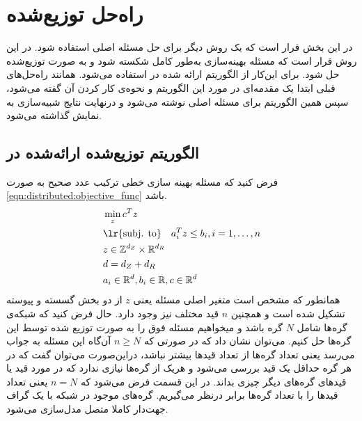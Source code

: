 



\section{راه‌حل توزیع‌شده}

در این بخش قرار است که یک روش دیگر برای حل مسئله اصلی استفاده شود. در این روش قرار است که مسئله بهینه‌سازی به‌طور کامل شکسته شود و به صورت توزیع‌شده حل شود. برای این‌کار از الگوریتم ارائه شده در \cite{testa2019distributed} استفاده می‌شود. همانند راه‌حل‌های قبلی ابتدا یک مقدمه‌ای  در مورد این الگوریتم و نحوه‌ی کار کردن آن گفته می‌شود، سپس همین الگوریتم برای مسئله اصلی نوشته می‌شود و درنهایت نتایج شبیه‌سازی به نمایش گذاشته می‌شود. 
\subsection{الگوریتم توزیع‌شده ارائه‌شده در \cite{testa2019distributed}}
فرض کنید که مسئله بهینه سازی خطی ترکیب عدد صحیح به صورت \cref{eqn:distributed:objective_func} باشد.
\begin{subequations}\label{eqn:distributed:objective_func}
	\begin{align}
		&\min_{z}c^Tz  \\
		&\text{\lr{subj. to}} \quad a_i^Tz \le b_i, i = 1, \dots, n  \\
		&z \in \mathbb{Z}^{d_Z} \times \mathbb{R}^{d_R} \\
		&d = d_Z + d_R  \\
		&a_i \in \mathbb{R}^d , b_i \in \mathbb{R}, c \in \mathbb{R}^d
	\end{align}
\end{subequations}
	همانطور که مشخص است متغیر اصلی مسئله یعنی $z$ از دو بخش گسسته و پیوسته تشکیل شده است و همچنین $n$ قید مختلف نیز وجود دارد. حال فرض کنید که شبکه‌ی گره‌ها شامل $N$ گره باشد و میخواهیم مسئله فوق را به صورت توزیع شده توسط این گره‌ها حل کنیم. می‌توان نشان داد که در صورتی که $n \ge N$ آن‌گاه این مسئله به جواب می‌رسد یعنی تعداد گره‌ها از تعداد قیدها بیشتر نباشد، دراین‌صورت می‌توان گفت که در هر گره حداقل یک قید بررسی می‌شود و هریک از گره‌ها نیازی ندارد که در مورد قید یا قیدهای گره‌های دیگر چیزی بداند. در این  قسمت فرض می‌شود که $n = N$ یعنی تعداد قیدها را با تعداد گره‌ها برابر درنظر می‌گیریم. 
	گره‌های موجود در شبکه با یک گراف جهت‌دار کاملا متصل مدل‌سازی می‌شود. 
	
